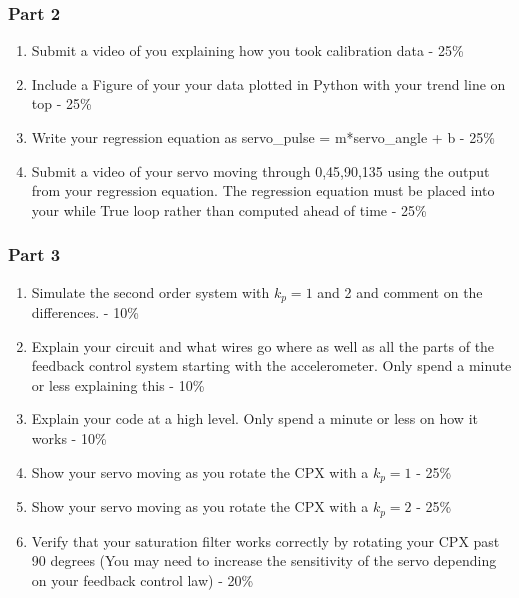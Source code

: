 \subsubsection{Part 2}
\begin{enumerate}[itemsep=-5pt]
\item Submit a video of you explaining how you took calibration data - 25\%
\item Include a Figure of your your data plotted in Python with your trend line on top - 25\%
\item Write your regression equation as servo\_pulse = m*servo\_angle + b - 25\%
\item Submit a video of your servo moving through 0,45,90,135 using the output from your regression equation. The regression equation must be placed into your while True loop rather than computed ahead of time -  25\% 
\end{enumerate}
\subsubsection{Part 3}
\begin{enumerate}[itemsep=-5pt]
\item Simulate the second order system with $k_p=1$ and 2 and comment on the differences. - 10\%
\item Explain your circuit and what wires go where as well as all the parts of the feedback control system starting with the accelerometer. Only spend a minute or less explaining this - 10\%
\item Explain your code at a high level. Only spend a minute or less on how it works - 10\%
\item Show your servo moving as you rotate the CPX with a $k_p=1$ - 25\%
\item Show your servo moving as you rotate the CPX with a $k_p=2$ - 25\%
\item Verify that your saturation filter works correctly by rotating your CPX past 90 degrees (You may need to increase the sensitivity of the servo depending on your feedback control law) - 20\% 
\end{enumerate}

